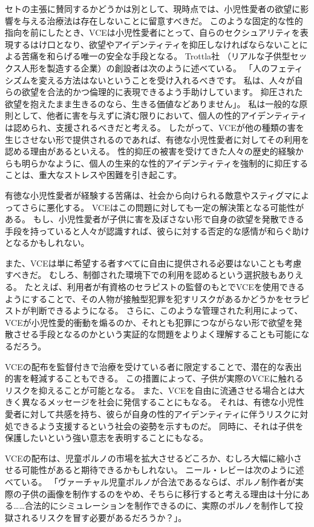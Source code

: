 \documentclass[paper=a4,book,openany]{jlreq}
\newcommand{\ig}[1]{}           %
\begin{document}
セトの主張に賛同するかどうかは別として、現時点では、小児性愛者の欲望に影響を与える治療法は存在しないことに留意すべきだ\citep[p.1155]{tiehen18:_virtual_ethic_creep_act}。
このような固定的な性的指向を前にしたとき、VCEは小児性愛者にとって、自らのセクシュアリティを表現するはけ口となり、欲望やアイデンティティを抑圧しなければならないことによる苦痛を和らげる唯一の安全な手段となる。
Trottla社 （リアルな子供型セックス人形を製造する企業）の創設者は次のように述べている。
「人のフェティシズムを変える方法はないということを受け入れるべきです。
私は、人々が自らの欲望を合法的かつ倫理的に表現できるよう手助けしています。
抑圧された欲望を抱えたまま生きるのなら、生きる価値などありません」\citep{morin16:_can_child_dolls_keep_pedop_offen}。
私は一般的な原則として、他者に害を与えずに済む限りにおいて、個人の性的アイデンティティは認められ、支援されるべきだと考える。
したがって、VCEが他の種類の害を生じさせない形で提供されるのであれば、有徳な小児性愛者に対してその利用を認める理由があるといえる。
性的抑圧の被害を受けてきた人々の歴史的経験からも明らかなように、個人の生来的な性的アイデンティティを強制的に抑圧することは、重大なストレスや困難を引き起こす。

有徳な小児性愛者が経験する苦痛は、社会から向けられる敵意やスティグマによってさらに悪化する。
VCEはこの問題に対しても一定の解決策となる可能性がある。
もし、小児性愛者が子供に害を及ぼさない形で自身の欲望を発散できる手段を持っていると人々が認識すれば、彼らに対する否定的な感情が和らぐ助けとなるかもしれない。

また、VCEは単に希望する者すべてに自由に提供される必要はないことも考慮すべきだ。
むしろ、制御された環境下での利用を認めるという選択肢もありえる。
たとえば、利用者が有資格のセラピストの監督のもとでVCEを使用できるようにすることで、その人物が接触型犯罪を犯すリスクがあるかどうかをセラピストが判断できるようになる。
さらに、このような管理された利用によって、VCEが小児性愛的衝動を煽るのか、それとも犯罪につながらない形で欲望を発散させる手段となるのかという実証的な問題をよりよく理解することも可能になるだろう。

VCEの配布を監督付きで治療を受けている者に限定することで、潜在的な表出的害を軽減することもできる。
この措置によって、子供が実際のVCEに触れるリスクを抑えることが可能となる。
また、VCEを自由に流通させる場合とは大きく異なるメッセージを社会に発信することにもなる。
それは、有徳な小児性愛者に対して共感を持ち、彼らが自身の性的アイデンティティに伴うリスクに対処できるよう支援するという社会の姿勢を示すものだ。
同時に、それは子供を保護したいという強い意志を表明することにもなる。

VCEの配布は、児童ポルノの市場を拡大させるどころか、むしろ大幅に縮小させる可能性があると期待できるかもしれない。
ニール・レビーは次のように述べている。
「ヴァーチャル児童ポルノが合法であるならば、ポルノ制作者が実際の子供の画像を制作するのをやめ、そちらに移行すると考える理由は十分にある……合法的にシミュレーションを制作できるのに、実際のポルノを制作して投獄されるリスクを冒す必要があるだろうか？」\citep[p.320]{levy02:_virtual_child_pornog}\ig{Neil Levy}。
\end{document}
